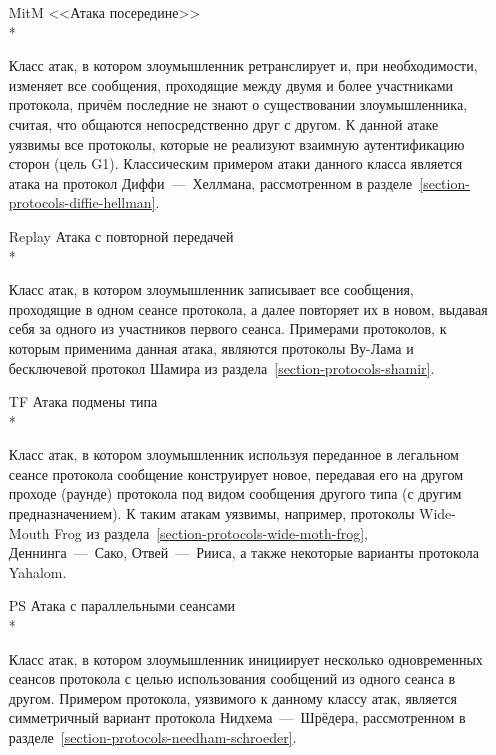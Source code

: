 \begin{itemize}
    \item[MitM] <<Атака посередине>>\\*
    \item[{}] Класс атак, в котором злоумышленник ретранслирует и, при необходимости, изменяет все сообщения, проходящие между двумя и более участниками протокола, причём последние не знают о существовании злоумышленника, считая, что общаются непосредственно друг с другом. К данной атаке уязвимы все протоколы, которые не реализуют взаимную аутентификацию сторон (цель G1). Классическим примером атаки данного класса является атака на протокол Диффи~---~Хеллмана, рассмотренном в разделе~\ref{section-protocols-diffie-hellman}.

    \item[Replay] Атака с повторной передачей\\*
    \item[{}] Класс атак, в котором злоумышленник записывает все сообщения, проходящие в одном сеансе протокола, а далее повторяет их в новом, выдавая себя за одного из участников первого сеанса. Примерами протоколов, к которым применима данная атака, являются протоколы Ву-Лама и бесключевой протокол Шамира из раздела~\ref{section-protocols-shamir}.

    \item[TF] Атака подмены типа\\*
    \item[{}] Класс атак, в котором злоумышленник используя переданное в легальном сеансе протокола сообщение конструирует новое, передавая его на другом проходе (раунде) протокола под видом сообщения другого типа (с другим предназначением). К таким атакам уязвимы, например, протоколы Wide-Mouth Frog из раздела~\ref{section-protocols-wide-moth-frog}, Деннинга~---~Сако, Отвей~---~Рииса, а также некоторые варианты протокола Yahalom.

    \item[PS] Атака с параллельными сеансами\\*
    \item[{}] Класс атак, в котором злоумышленник инициирует несколько одновременных сеансов протокола с целью использования сообщений из одного сеанса в другом. Примером протокола, уязвимого к данному классу атак, является симметричный вариант протокола Нидхема~---~Шрёдера, рассмотренном в разделе~\ref{section-protocols-needham-schroeder}.


\end{itemize}
